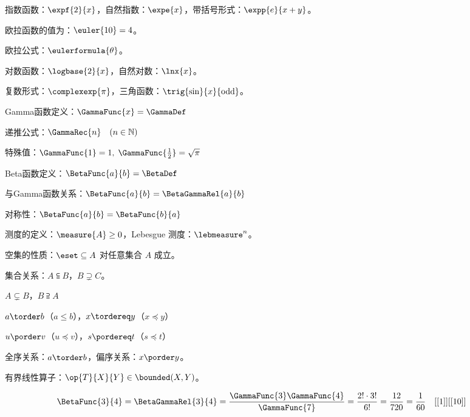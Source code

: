 \begin{tcblisting}{}
	
	指数函数：$\expf{2}{x}$，自然指数：$\expe{x}$，带括号形式：$\expp{e}{x+y}$。
	
	欧拉函数的值为：$\euler{10} = 4$。
	
	欧拉公式：$\eulerformula{\theta}$。
	
	对数函数：$\logbase{2}{x}$，自然对数：$\lnx{x}$。
	
	复数形式：$\complexexp{\pi}$，三角函数：$\trig{\sin}{x}{\text{odd}}$。
\end{tcblisting}
\begin{tcblisting}{}
	Gamma函数定义：$\GammaFunc{x} = \GammaDef$ 
	
	递推公式：$\GammaRec{n} \quad (n \in \mathbb{N})$ 
	
	特殊值：$\GammaFunc{1} = 1,\; \GammaFunc{\frac{1}{2}} = \sqrt{\pi}$ 
	
	Beta函数定义：$\BetaFunc{a}{b} = \BetaDef$ 
	
	与Gamma函数关系：$\BetaFunc{a}{b} = \BetaGammaRel{a}{b}$ 
	
	对称性：$\BetaFunc{a}{b} = \BetaFunc{b}{a}$ 
\end{tcblisting}
\begin{tcblisting}{}
	测度的定义：$\measure{A} \geq 0$，Lebesgue 测度：$\lebmeasure^n$。
	
	空集的性质：$\eset \subseteq A$ 对任意集合 $A$ 成立。
	
	集合关系：$A \subseteqq B$，$B \supsetneq C$。
	
	$A \subsetneq B$，$B \supseteqq A$
	
	$a \torder b$（$a \leq b$），$x \tordereq y$（$x \preceq y$）
	
	$u \porder v$（$u \preceq v$），$s \pordereq t$（$s \preccurlyeq t$）
	
	全序关系：$a \torder b$，偏序关系：$x \porder y$。
	
	有界线性算子：$\op{T}{X}{Y} \in \bounded(X,Y)$。
\end{tcblisting}

\begin{tcblisting}{}
	\begin{align*}
		\BetaFunc{3}{4} &= \BetaGammaRel{3}{4} 
		= \frac{\GammaFunc{3}\GammaFunc{4}}{\GammaFunc{7}} 
		= \frac{2! \cdot 3!}{6!} 
		= \frac{12}{720} 
		= \frac{1}{60} \quad [[1]][[10]]
	\end{align*}
\end{tcblisting}

